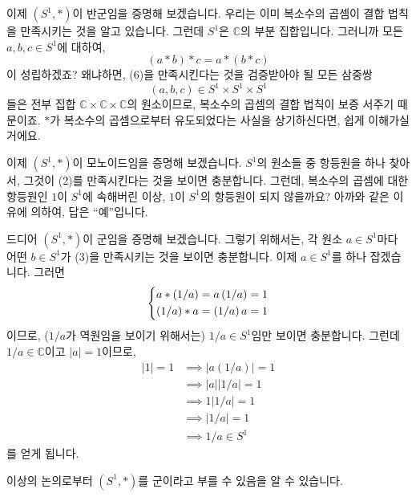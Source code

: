 \documentclass[12pt]{paper}
\begin{document}
  이제 $\left( S^1 , * \right)$이 반군임을 증명해 보겠습니다.
  우리는 이미 복소수의 곱셈이 결합 법칙을 만족시키는 것을 알고 있습니다.
  그런데 $S^1$은 $\mathbb{C}$의 부분 집합입니다.
  그러니까 모든 $a , b , c \in S^1$에 대하여, 
  \begin{equation*}
    (a * b) * c = a * (b * c) \tag{6}
  \end{equation*}
  이 성립하겠죠?
  왜냐하면, (6)을 만족시킨다는 것을 검증받아야 될 모든 삼중쌍 $$ \left( a , b , c \right) \in S^1 \times S^1 \times S^1 $$들은
  전부 집합 $\mathbb{C} \times \mathbb{C} \times \mathbb{C}$의 원소이므로,
  복소수의 곱셈의 결합 법칙이 보증 서주기 때문이죠.
  $*$가 복소수의 곱셈으로부터 유도되었다는 사실을 상기하신다면,
  쉽게 이해가실 거에요.

  이제 $\left( S^1 , * \right)$이 모노이드임을 증명해 보겠습니다.
  $S^1$의 원소들 중 항등원을 하나 찾아서, 그것이 (2)를 만족시킨다는 것을 보이면 충분합니다.
  그런데, 복소수의 곱셈에 대한 항등원인 $1$이 $S^1$에 속해버린 이상, $1$이 $S^1$의 항등원이 되지 않을까요?
  아까와 같은 이유에 의하여, 답은 ``예''입니다.

  드디어 $\left( S^1 , * \right)$이 군임을 증명해 보겠습니다.
  그렇기 위해서는, 각 원소 $a \in S^1$마다 어떤 $b \in S^1$가 (3)을 만족시키는 것을 보이면 충분합니다.
  이제 $a \in S^1$를 하나 잡겠습니다.
  그러면
  \begin{equation}
    \left\{ \begin{aligned}
      a * \left( 1 / a \right) = a \left( 1 / a \right) = 1 \\
      \left( 1 / a \right) * a = \left( 1 / a \right) a = 1
    \end{aligned} \right. \notag
  \end{equation}
  이므로,
  ($1 / a$가 역원임을 보이기 위해서는) $1 / a \in S^1$임만 보이면 충분합니다.
  그런데 $1 / a \in \mathbb{C}$이고 $\left| a \right| = 1$이므로,
  \begin{align*}
    \left| 1 \right| = 1 
    & \implies \left| a \left( 1 / a \right) \right| = 1 \\
    & \implies \left| a \right| \left| 1 / a \right| = 1 \\
    & \implies 1 \left| 1 / a \right| = 1 \\
    & \implies \left| 1 / a \right| = 1 \\
    & \implies 1 / a \in S^1
  \end{align*}
  를 얻게 됩니다.

  이상의 논의로부터 $\left( S^1 , * \right)$를 군이라고 부를 수 있음을 알 수 있습니다.

  

  
\end{document}
